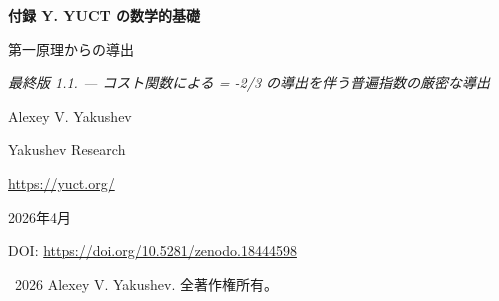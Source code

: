 \documentclass[11pt,a4paper]{article}
\begin{document}
	
	\begin{titlepage}
		\centering
		\vspace*{0cm}
		
		{\Huge\bfseries 付録 Y. YUCT の数学的基礎\par}
		\vspace{0.3cm}
		{\Large 第一原理からの導出\par}
		\vspace{0.3cm}
		{\large \textit{最終版 1.1. — コスト関数による \mu = -2/3 の導出を伴う普遍指数の厳密な導出}\par}
		\vspace{1.5cm}
		
		{\large Alexey V. Yakushev\par}
		\vspace{0.3cm}
		{\normalsize Yakushev Research\par}
		{\normalsize \url{https://yuct.org/}\par}
		
		\vspace{0.5cm}
		{\normalsize 2026年4月\par}
		\vspace{0.3cm}
		{\normalsize DOI: \url{https://doi.org/10.5281/zenodo.18444598}\par}
		
		\vfill
		
		\begin{abstract}
			\noindent
			本稿は、Yakushev 統一協調理論 (YUCT) の数学的基礎を厳密かつ自己完結的な形式で提示する。協調クラスターと効率パラメータ \(K_{\mathrm{eff}}\) の定義から出発して、協調ネットワークの微視的モデルを構築する。三つの基本公理——階層的スケール不変性、辞書の二値完全性、三次元埋め込み——から、レベル間のエントロピー分布を決定する。第四の巨視的スケール不変性公理とインデックス伝達の明示的コスト関数を追加することにより、普遍誤差律 \(\varepsilon \propto K_{\mathrm{eff}}^{-\beta}\)（\(\beta = 2/3\)）を定理として導出する。協調場の有効スカラー-テンソル作用、修正アインシュタイン方程式、宇宙定数のトポロジカル起源、フェルミオン質量階層は、コア定理に基づく帰結または予想として導入される。すべての主張は、公理、定理、予想、仮定、または現象論的法則として明示的にラベル付けされる。この理論は、温度依存の重力定数を含む具体的で反証可能な予測を行う。新しい節は、普遍誤差律を素数の漸近分布（本文の定理~4）と結び付け、同じ指数 \(\beta = 2/3\) が素数変動を支配することを示す。
		\end{abstract}
		
		\vspace{0.5cm}
		\textcopyright\ 2026 Alexey V. Yakushev. 全著作権所有。
	\end{titlepage}
	
\end{document}
